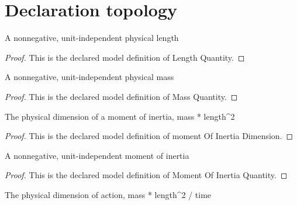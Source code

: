 \section{Declaration topology}
\begin{definition}
  \label{def:physics:phyx-mini-0571:phyxminiproblems-problemphyxmini0571-lengthquantity}
  A nonnegative, unit-independent physical length
\end{definition}
\begin{proof}
  This is the declared model definition of Length Quantity.
\end{proof}
\begin{definition}
  \label{def:physics:phyx-mini-0571:phyxminiproblems-problemphyxmini0571-massquantity}
  A nonnegative, unit-independent physical mass
\end{definition}
\begin{proof}
  This is the declared model definition of Mass Quantity.
\end{proof}
\begin{definition}
  \label{def:physics:phyx-mini-0571:phyxminiproblems-problemphyxmini0571-momentofinertiadimension}
  The physical dimension of a moment of inertia, mass * length\textasciicircum{}2
\end{definition}
\begin{proof}
  This is the declared model definition of moment Of Inertia Dimension.
\end{proof}
\begin{definition}
  \label{def:physics:phyx-mini-0571:phyxminiproblems-problemphyxmini0571-momentofinertiaquantity}
  A nonnegative, unit-independent moment of inertia
\end{definition}
\begin{proof}
  This is the declared model definition of Moment Of Inertia Quantity.
\end{proof}
\begin{definition}
  \label{def:physics:phyx-mini-0571:phyxminiproblems-problemphyxmini0571-actiondimension}
  The physical dimension of action, mass * length\textasciicircum{}2 / time
\end{definition}
